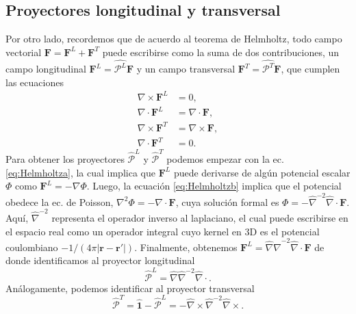 \documentclass[12pt]{article}
\begin{document}

\subsection{Proyectores longitudinal y transversal}
Por otro lado, recordemos que de acuerdo al teorema de Helmholtz, todo
campo vectorial $\bm F=\bm F^L+\bm F^T$ puede escribirse como la suma
de dos contribuciones, un campo longitudinal
$\bm F^L=\hat{\mathcal P^L}\bm F$ y un campo transversal
$\bm F^T=\hat{\mathcal P^T}\bm F$, que cumplen las ecuaciones
\begin{subequations}
  \label{eq:Helmholtz}
  \begin{align}
    \label{eq:Helmholtza}\nabla\times\bm F^L&=0,\\
    \label{eq:Helmholtzb}\nabla\cdot\bm F^L&=\nabla\cdot\bm F,\\
    \label{eq:Helmholtzc}\nabla\times\bm F^T&=\nabla\times\bm F,\\
    \label{eq:Helmholtzd}\nabla\cdot\bm F^T&=0.
  \end{align}
\end{subequations}
Para obtener los proyectores $\hat{\mathcal P}^L$ y  $\hat{\mathcal
  P}^T$ podemos empezar con la ec. \eqref{eq:Helmholtza}, la cual implica
que $\bm F^L$ puede derivarse de algún potencial escalar $\Phi$ como
$\bm F^L=-\nabla\Phi$. Luego, la ecuación \eqref{eq:Helmholtzb}
implica que el potencial obedece la ec. de Poisson,
$\nabla^2\Phi=-\nabla\cdot\bm F$, cuya solución formal es
$\Phi=-\hat\nabla^{-2}\hat\nabla\cdot\bm F$. Aquí, $\hat\nabla^{-2}$
representa el operador inverso al laplaciano, el cual puede escribirse
en el espacio real como un operador integral cuyo kernel en 3D es el
potencial coulombiano $-1/(4\pi|\bm r-\bm r'|)$. Finalmente,
obtenemos $\bm F^L=\hat\nabla\hat\nabla^{-2}\hat\nabla\cdot\bm F$ de
donde identificamos al proyector longitudinal
\begin{equation}
  \label{eq:PL}
  \hat{\mathcal P}^L=\hat\nabla\hat\nabla^{-2}\hat\nabla\cdot .
\end{equation}
Análogamente, podemos identificar al proyector transversal
\begin{equation}
  \label{eq:PT}
  \hat{\mathcal P}^T=\hat{\bm 1}-\hat{\mathcal P}^L=-\hat\nabla\times \hat\nabla^{-2}\hat\nabla\times.
\end{equation}
\end{document}
